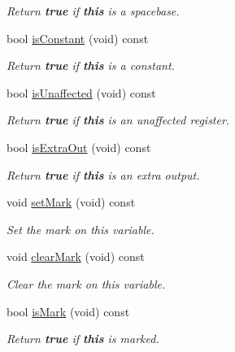 \begin{DoxyCompactItemize}
\begin{DoxyCompactList}\small\item\em Return {\bfseries{true}} if {\bfseries{this}} is a {\itshape spacebase}. \end{DoxyCompactList}\item 
bool \mbox{\hyperlink{class_high_variable_ad98daa755444e757ae938fc735cbf73d}{is\+Constant}} (void) const
\begin{DoxyCompactList}\small\item\em Return {\bfseries{true}} if {\bfseries{this}} is a constant. \end{DoxyCompactList}\item 
bool \mbox{\hyperlink{class_high_variable_a9344764c89aa949fc3fe0b8512d5f549}{is\+Unaffected}} (void) const
\begin{DoxyCompactList}\small\item\em Return {\bfseries{true}} if {\bfseries{this}} is an {\itshape unaffected} register. \end{DoxyCompactList}\item 
bool \mbox{\hyperlink{class_high_variable_a35417f6a1f6c8f4b4d54d13f859fdc66}{is\+Extra\+Out}} (void) const
\begin{DoxyCompactList}\small\item\em Return {\bfseries{true}} if {\bfseries{this}} is an extra output. \end{DoxyCompactList}\item 
void \mbox{\hyperlink{class_high_variable_a8ccb310648ddc7b9d81d19ff24b0c669}{set\+Mark}} (void) const
\begin{DoxyCompactList}\small\item\em Set the mark on this variable. \end{DoxyCompactList}\item 
void \mbox{\hyperlink{class_high_variable_ad2a2358b61d172dbaf311b0416e91fb3}{clear\+Mark}} (void) const
\begin{DoxyCompactList}\small\item\em Clear the mark on this variable. \end{DoxyCompactList}\item 
bool \mbox{\hyperlink{class_high_variable_a63f59a7a1984e26d1fd6aa545f058637}{is\+Mark}} (void) const
\begin{DoxyCompactList}\small\item\em Return {\bfseries{true}} if {\bfseries{this}} is marked. \end{DoxyCompactList}\item 

\end{DoxyCompactItemize}
